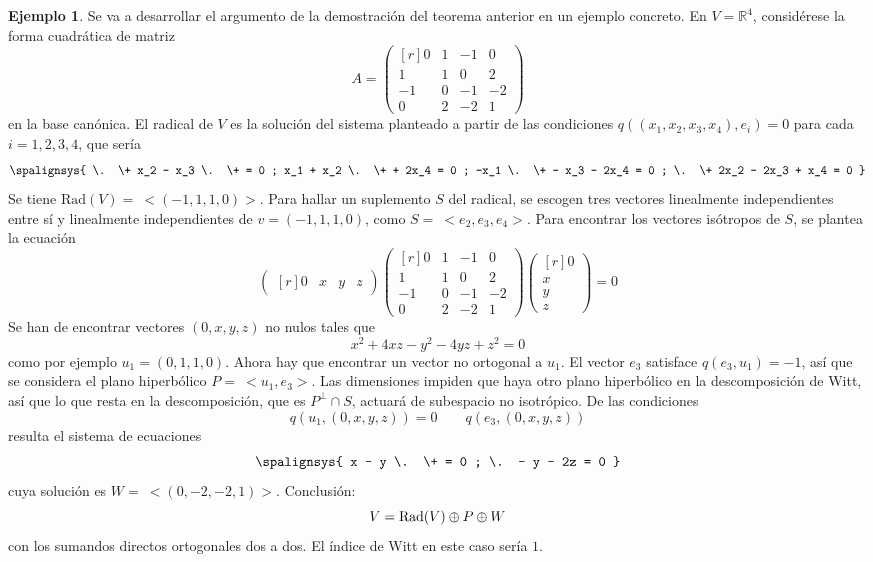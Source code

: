 \documentclass[12pt]{report}
\theoremstyle{definition}
\theoremstyle{definition}
\newtheorem{example}{Ejemplo}[chapter]
\theoremstyle{remark}
\newcommand{\R}{\mathbb R}
\begin{document}
\begin{example}
Se va a desarrollar el argumento de la demostración del teorema anterior en un ejemplo concreto. En $V= \R^4$, considérese la forma cuadrática de matriz
\[A = \begin{pmatrix*}[r]
    0 & 1 & -1 & 0 \\
    1 & 1 & 0 & 2 \\
    -1 & 0 & -1 & -2 \\
    0 & 2 & -2 & 1
\end{pmatrix*}\]
en la base canónica. El radical de $V$ es la solución del sistema planteado a partir de las condiciones $q((x_1,x_2,x_3,x_4),e_i) = 0$ para cada $i = 1,2,3,4$, que sería
\[
\spalignsys{
\. \+ x_2 - x_3 \. \+ = 0 ;
x_1 + x_2 \. \+ + 2x_4 = 0 ;
-x_1 \. \+ - x_3 - 2x_4 = 0 ;
\. \+ 2x_2 - 2x_3 + x_4 = 0
}
\]
Se tiene $\textrm{Rad}(V)= \ <(-1,1,1,0)>$. Para hallar un suplemento $S$ del radical, se escogen tres vectores linealmente independientes entre sí y linealmente independientes de $v = (-1,1,1,0)$, como $S = \ <e_2,e_3,e_4>$. Para encontrar los vectores isótropos de $S$, se plantea la ecuación
\[\begin{pmatrix*}[r]
    0 & x & y & z
\end{pmatrix*}\begin{pmatrix*}[r]
    0 & 1 & -1 & 0 \\
    1 & 1 & 0 & 2 \\
    -1 & 0 & -1 & -2 \\
    0 & 2 & -2 & 1
\end{pmatrix*} \begin{pmatrix*}[r]
    0 \\
    x \\
    y \\
    z
\end{pmatrix*} = 0\]
Se han de encontrar vectores $(0,x,y,z)$ no nulos tales que
\[x^2+4xz-y^2-4yz+z^2=0\]
como por ejemplo $u_1=(0,1,1,0)$. Ahora hay que encontrar un vector no ortogonal a $u_1$. El vector $e_3$ satisface $q(e_3,u_1) = -1$, así que se considera el plano hiperbólico $P = \ <u_1,e_3>$. Las dimensiones impiden que haya otro plano hiperbólico en la descomposición de Witt, así que lo que resta en la descomposición, que es $P^\perp \cap S$, actuará de subespacio no isotrópico. De las condiciones
\[q(u_1,(0,x,y,z)) = 0 \qquad q(e_3,(0,x,y,z))\]
resulta el sistema de ecuaciones
\[
\spalignsys{
x - y \. \+ = 0 ;
\. - y - 2z = 0
}
\]
cuya solución es $W = \ <(0,-2,-2,1)>$. Conclusión:
\[V = \textup{Rad}(V) \oplus P \oplus W\]
con los sumandos directos ortogonales dos a dos. El índice de Witt en este caso sería $1$.

\end{example}
\end{document}
